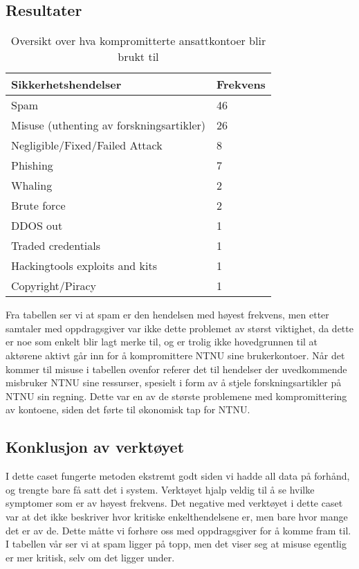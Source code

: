 \subsection{Resultater}
\begin{table} [H]
    \begin{tabular}{ | m{18em} | m{18em} | }
        \hline
            \cellcolor{yellow} Sikkerhetshendelser & \cellcolor{yellow} Frekvens \\
        \hline
            Spam & 46  \\
        \hline
            Misuse (uthenting av forskningsartikler) & 26 \\
        \hline
            Negligible/Fixed/Failed Attack  & 8 \\
        \hline
            Phishing & 7 \\
        \hline
            Whaling & 2 \\
        \hline
            Brute force & 2 \\
        \hline
            DDOS out & 1 \\
        \hline
            Traded credentials & 1 \\
        \hline
            Hackingtools exploits and kits & 1 \\
        \hline
            Copyright/Piracy & 1 \\
        \hline
    \end{tabular}
    \caption{Oversikt over hva kompromitterte ansattkontoer blir brukt til}
    \label{kritisk_tabell_2}
\end{table}

Fra tabellen ser vi at spam er den hendelsen med høyest frekvens, men etter samtaler med oppdragsgiver var ikke dette problemet av størst viktighet, da dette er noe som enkelt blir lagt merke til, og er trolig ikke hovedgrunnen til at aktørene aktivt går inn for å kompromittere NTNU sine brukerkontoer. Når det kommer til misuse i tabellen ovenfor referer det til hendelser der uvedkommende misbruker NTNU sine ressurser, spesielt i form av å stjele forskningsartikler på NTNU sin regning. Dette var en av de største problemene med kompromittering av kontoene, siden det førte til økonomisk tap for NTNU. 


\subsection{Konklusjon av verktøyet}
I dette caset fungerte metoden ekstremt godt siden vi hadde all data på forhånd, og trengte bare få satt det i system. Verktøyet hjalp veldig til å se hvilke symptomer som er av høyest frekvens. Det negative med verktøyet i dette caset var at det ikke beskriver hvor kritiske enkelthendelsene er, men bare hvor mange det er av de. Dette måtte vi forhøre oss med oppdragsgiver for å komme fram til. I tabellen vår ser vi at spam ligger på topp, men det viser seg at misuse egentlig er mer kritisk, selv om det ligger under. 




